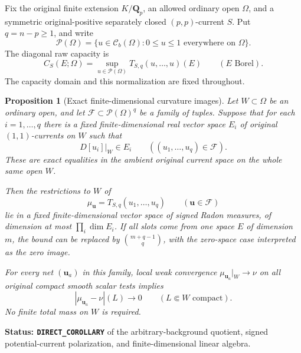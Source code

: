 \documentclass[11pt,a4paper]{article}
\numberwithin{equation}{section}
\newtheorem{proposition}[theorem]{Proposition}
\theoremstyle{definition}
\theoremstyle{remark}
\begin{document}
Fix the original finite extension $K/\mathbf Q_p$, an allowed
ordinary open $\Omega$, and a symmetric original-positive
separately closed $(p,p)$-current $S$.  Put $q=n-p\ge1$, and
write
\[
 \mathcal P(\Omega)
   =\{u\in\mathcal C_b(\Omega):0\le u\le1\text{ everywhere on }\Omega\}.
\]
The diagonal raw capacity is
\[
 C_S(E;\Omega)=\sup_{u\in\mathcal P(\Omega)}
                  T_{S,q}(u,\ldots,u)(E)
 \qquad(E\text{ Borel}).
\]
The capacity domain and this normalization are fixed throughout.

\begin{proposition}[Exact finite-dimensional curvature images]
\label{prop:r5-finite-curvature-tv}
Let $W\subset\Omega$ be an ordinary open, and let
$\mathcal F\subset\mathcal P(\Omega)^q$ be a family of tuples.
Suppose that for each $i=1,\ldots,q$ there is a fixed
finite-dimensional real vector space $E_i$ of original
$(1,1)$-currents on $W$ such that
\[
             D[u_i]|_W\in E_i
       \qquad((u_1,\ldots,u_q)\in\mathcal F).
\]
These are exact equalities in the ambient original current
space on the whole same open $W$.

Then the restrictions to $W$ of
\[
              \mu_{\mathbf u}=T_{S,q}(u_1,\ldots,u_q)
                     \qquad(\mathbf u\in\mathcal F)
\]
lie in a fixed finite-dimensional vector space of signed Radon
measures, of dimension at most $\prod_i\dim E_i$.
If all slots come from one space $E$ of dimension $m$, the
bound can be replaced by $\binom{m+q-1}{q}$, with the
zero-space case interpreted as the zero image.

For every net $(\mathbf u_a)$ in this family, local weak
convergence $\mu_{\mathbf u_a}|_W\to\nu$ on all original
compact smooth scalar tests implies
\begin{equation}
       |\mu_{\mathbf u_a}-\nu|(L)\longrightarrow0
                      \qquad(L\Subset W\text{ compact}).
 \label{eq:r5-finite-curvature-tv}
\end{equation}
No finite total mass on $W$ is required.
\end{proposition}

\noindent\textbf{Status: \texttt{DIRECT\_COROLLARY}} of
the arbitrary-background quotient, signed potential-current
polarization, and finite-dimensional linear algebra.
\end{document}
